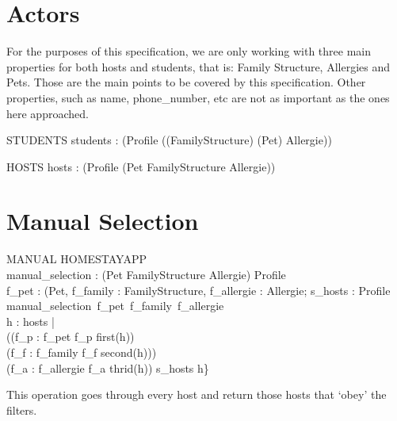 \documentclass[11pt]{article}
\begin{document}

\section*{Actors}
For the purposes of this specification, we are only working with three main properties for both hosts and students, that is: Family Structure, Allergies and Pets.
Those are the main points to be covered by this specification. Other properties, such as name, phone\_number, etc are not as important as the ones here approached.
\begin{schema}{STUDENTS}
	students : \power (Profile \rightarrow (\power (\nat \rightarrow FamilyStructure) \cross \power (\nat \rightarrow Pet) \cross \power Allergie))  \\
\where
\end{schema}
\begin{schema}{HOSTS}
	hosts : \power (Profile \rightarrow (\power Pet \cross FamilyStructure \cross \power Allergie))
\where
\end{schema}


\section*{Manual Selection}

\begin{schema}{MANUAL}
	\Xi HOMESTAYAPP\\
	manual\_selection : (\power Pet \cross \power FamilyStructure \cross \power Allergie) \rightarrow \power Profile\\
\where
	\forall f\_pet : (\power Pet, f\_family : \power FamilyStructure, f\_allergie : \power Allergie; s\_hosts : \power Profile\\
	\bullet manual\_selection\ f\_pet\ f\_family\ f\_allergie\ \Leftrightarrow\\
	\forall h : hosts |\\ 
					\indent ((\forall f\_p : f\_pet \bullet f\_p \in first(\ran h)) \vee \\
					\indent (\forall f\_f : f\_family \bullet f\_f \in second(\ran h))) \wedge\\
					\indent \neg (\forall f\_a : f\_allergie \bullet f\_a \in thrid(\ran h)) \bullet s\_hosts \cup h\}
\end{schema}
This operation goes through every host and return those hosts that `obey' the filters.
\end{document}
